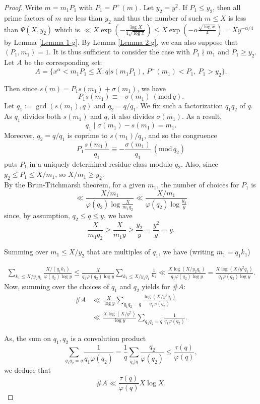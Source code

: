 \documentclass[11pt, reqno]{amsart}
\theoremstyle{remark}
\numberwithin{theorem}{section}
\numberwithin{proposition}{section}
\numberwithin{lemma}{section}
\numberwithin{corollary}{section}
\numberwithin{equation}{section}
\numberwithin{conjecture}{section}
\numberwithin{definition}{section}
\renewcommand{\bmod}[1]{\ ( \mathrm{mod} \, #1 )}
\begin{document}
 \begin{proof}

	Write $m=m_1P_1$ with $P_1=P^{+}(m)$. Let $y_2=y^2$.
 If $P_1\le y_2$, then all prime factors of $m$ are less than $y_2$ and thus the number of such $m\le X$ is less than
 $\Psi (X , y_2)$ which is $\ll X\exp (-\frac{\log X}{4\sqrt{\log x}}) \leq X\exp (-\alpha\frac{\sqrt{\log x}}{4}) =Xy^{-\alpha/4}$ by Lemma \ref{Lemma 1-g}.
 By Lemma \ref{Lemma 2-g}, we can also suppose that $(P_1,m_1)=1$.  It is thus sufficient to consider the case with 
	$P_1\nmid m_1$ and  $P_1\geq y_2$. Let $A$ be the corresponding set:
 \[
 A=\{ x^\alpha < m_1P_1\le X : q|s(m_1P_1),\, P^+ (m_1)<P_1,\ P_1>y_2\}.
 \]
 
 
 
 Then since $s(m)=P_1s(m_1)+\sigma(m_1)$, we have 
	\[P_1s(m_1)\equiv -\sigma(m_1)\bmod{q}. \]
	Let $q_1:=\gcd(s(m_1), q)$ and $q_2=q/q_1$. We fix such a factorization $q_1q_2$ of $q$.
	As $q_1$ divides both $s(m_1)$ and $q$, it also divides $\sigma(m_1)$. As a result, 
	\[q_1\mid\sigma(m_1)-s(m_1)=m_1. \]
	Moreover, $q_2=q/q_1$ is coprime to $s(m_1)/q_1$, and so the congruence
	\[P_1\frac{s(m_1)}{q_1}\equiv- \frac{\sigma(m_1)}{q_1}\bmod{q_2}\]
	puts $P_1$ in a uniquely determined residue class modulo $q_2$. Also, since $y_2\leqslant P_1\leq X/m_1$,  
	so $X/m_1\geq y_2$.\\
	By the Brun-Titchmarsh theorem, for a given $m_1$, the number of choices for $P_1$ is 
	\[\ll \frac{X/m_1}{\varphi(q_2)\log\frac{X}{m_1q_2}}\ll\frac{X/m_1}{\varphi(q_2)\log\frac{y_2}{y}} \]
	since, by assumption, $q_2 \leq q \leq y$, we have
	\[\frac{X}{m_1q_2}\geq \frac{X}{m_1 y}\geq \frac{y_2}{y} = \frac{y^2}{y} = y.\]
 
 
	Summing over $m_1\leq X/y_2$ that are multiples of $q_1$, we have (writing $m_1=q_1k_1$)
	
	\begin{align*}
 \sum_{k_1\leq X/y_2q_1}\frac{X/(q_1k_1)}{\varphi(q_2)\log y} \leq\frac{X}{q_1\varphi(q_2)\log y} \sum_{k_1\leq X/y_2q_1}\frac{1}{k_1}\ll\frac{X \log(X/y_2q_1)}{q_1\varphi(q_2)\log y} =\frac{X \log(X/y^2q_1)}{q_1\varphi(q_2)\log y}. 
 \end{align*}
	Now, summing over the choices of $q_1$ and $q_2$ yields for $\# A$:\\
	\begin{align*}
 \# A&\ll\frac{X}{\log y}\sum_{q_1q_2=q}\frac{\log(X/y^2q_1)}{q_1\varphi(q_2)} \\ &\ll\frac{X\log(X/y^2)}{\log y}\sum_{q_1q_2=q}\frac{1}{q_1\varphi(q_2)}. 
 \end{align*}
 
 As, the sum on $q_1,q_2$ is a convolution product
 \[ \sum_{q_1q_2=q}\frac{1}{q_1\varphi (q_2)} =\frac{1}{q}\sum_{q_2|q}\frac{q_2}{\varphi (q_2)}\le \frac{\tau (q)}{\varphi (q)},\]
 we deduce that \[\# A \ll \frac{\tau (q)}{\varphi (q)}{X\log X}.
\]

\end{proof}
 
\end{document}
